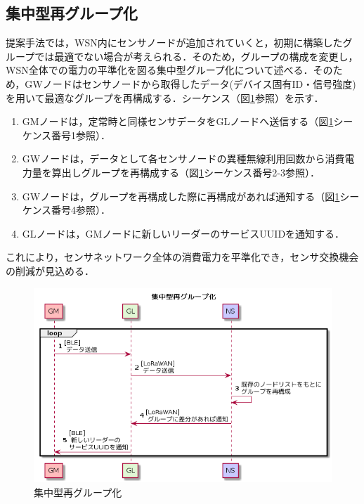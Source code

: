 \subsection{集中型再グループ化}
提案手法では，WSN内にセンサノードが追加されていくと，初期に構築したグループでは最適でない場合が考えられる．そのため，グループの構成を変更し，WSN全体での電力の平準化を図る集中型グループ化について述べる．そのため，GWノードはセンサノードから取得したデータ(デバイス固有ID・信号強度)を用いて最適なグループを再構成する．シーケンス（図\ref{fig:group_reconstruction_concentrately}参照）を示す．

\begin{enumerate}
    \item GMノードは，定常時と同様センサデータをGLノードへ送信する（図\ref{fig:group_reconstruction_concentrately}シーケンス番号1参照）．
    \item GWノードは，データとして各センサノードの異種無線利用回数から消費電力量を算出しグループを再構成する（図\ref{fig:group_reconstruction_concentrately}シーケンス番号2-3参照）．
    \item GWノードは，グループを再構成した際に再構成があれば通知する（図\ref{fig:group_reconstruction_concentrately}シーケンス番号4参照）．
    \item GLノードは，GMノードに新しいリーダーのサービスUUIDを通知する．
\end{enumerate}

これにより，センサネットワーク全体の消費電力を平準化でき，センサ交換機会の削減が見込める．

\begin{figure}[]
    \begin{center}
    \includegraphics[width=14cm]{figures/v2.0/集中型再グループ化.png}
    \caption{集中型再グループ化}
    \label{fig:group_reconstruction_concentrately}
    \end{center}
\end{figure}